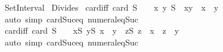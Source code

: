 %
\begin{isabellebody}%
%
%
\isadelimdocument
%
\endisadelimdocument
%
\isatagdocument
%
\isamarkuptrue%
%
\endisatagdocument
{\isafolddocument}%
%
\isadelimdocument
%
\endisadelimdocument
%
\isadelimtheory
%
\endisadelimtheory
%
\isatagtheory
{}\isamarkupfalse%
\ Set{\isacharunderscore}{\kern0pt}Interval\isanewline
{}\ Divides\isanewline
{}%
\endisatagtheory
{\isafoldtheory}%
%
\isadelimtheory
\isanewline
%
\endisadelimtheory
\isanewline
\isanewline
{}\isamarkupfalse%
\ card{\isacharunderscore}{\kern0pt}{}{\isacharunderscore}{\kern0pt}iff{\isacharcolon}{\kern0pt}\ {\isachardoublequoteopen}card\ S\ {\isacharequal}{\kern0pt}\ {}\ {\isasymlongleftrightarrow}\ {\isacharparenleft}{\kern0pt}{\isasymexists}x\ y{\isachardot}{\kern0pt}\ S\ {\isacharequal}{\kern0pt}\ {\isacharbraceleft}{\kern0pt}x{\isacharcomma}{\kern0pt}y{\isacharbraceright}{\kern0pt}\ {\isasymand}\ x\ {\isasymnoteq}\ y{\isacharparenright}{\kern0pt}{\isachardoublequoteclose}\isanewline
%
\isadelimproof
\ \ %
\endisadelimproof
%
\isatagproof
{}\isamarkupfalse%
\ {\isacharparenleft}{\kern0pt}auto\ simp{\isacharcolon}{\kern0pt}\ card{\isacharunderscore}{\kern0pt}Suc{\isacharunderscore}{\kern0pt}eq\ numeral{\isacharunderscore}{\kern0pt}eq{\isacharunderscore}{\kern0pt}Suc{\isacharparenright}{\kern0pt}%
\endisatagproof
{\isafoldproof}%
%
\isadelimproof
\isanewline
%
\endisadelimproof
\isanewline
{}\isamarkupfalse%
\ card{\isacharunderscore}{\kern0pt}{}{\isacharunderscore}{\kern0pt}iff{\isacharprime}{\kern0pt}{\isacharcolon}{\kern0pt}\ {\isachardoublequoteopen}card\ S\ {\isacharequal}{\kern0pt}\ {}\ {\isasymlongleftrightarrow}\ {\isacharparenleft}{\kern0pt}{\isasymexists}x{\isasymin}S{\isachardot}{\kern0pt}\ {\isasymexists}y{\isasymin}S{\isachardot}{\kern0pt}\ x\ {\isasymnoteq}\ y\ {\isasymand}\ {\isacharparenleft}{\kern0pt}{\isasymforall}z{\isasymin}S{\isachardot}{\kern0pt}\ z\ {\isacharequal}{\kern0pt}\ x\ {\isasymor}\ z\ {\isacharequal}{\kern0pt}\ y{\isacharparenright}{\kern0pt}{\isacharparenright}{\kern0pt}{\isachardoublequoteclose}\isanewline
%
\isadelimproof
\ \ %
\endisadelimproof
%
\isatagproof
{}\isamarkupfalse%
\ {\isacharparenleft}{\kern0pt}auto\ simp{\isacharcolon}{\kern0pt}\ card{\isacharunderscore}{\kern0pt}Suc{\isacharunderscore}{\kern0pt}eq\ numeral{\isacharunderscore}{\kern0pt}eq{\isacharunderscore}{\kern0pt}Suc{\isacharparenright}{\kern0pt}%

\end{isabellebody}
